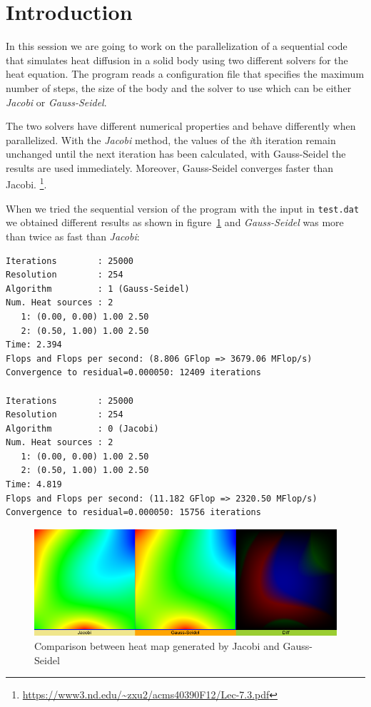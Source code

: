 \tableofcontents
\pagebreak

\section{Introduction}%
\label{sec:introduction}

In this session we are going to work on the parallelization of a sequential code that
simulates heat diffusion in a solid body using two different solvers for the heat equation.
The program reads a configuration file that specifies the maximum number of steps, the size
of the body and the solver to use which can be either \emph{Jacobi} or \emph{Gauss-Seidel}.

The two solvers have different numerical properties and behave differently when parallelized.
With the \emph{Jacobi} method, the values of the \emph{i}th iteration remain unchanged until
the next iteration has been calculated, with Gauss-Seidel the results are used immediately.
Moreover, Gauss-Seidel converges faster than Jacobi.
\footnote{\url{https://www3.nd.edu/~zxu2/acms40390F12/Lec-7.3.pdf}}.

When we tried the sequential version of the program with the input in \texttt{test.dat}
we obtained different results as shown in figure~\ref{fig:mosaic_label} and 
\emph{Gauss-Seidel} was more than twice as fast than \emph{Jacobi}:

\begin{verbatim}
Iterations        : 25000
Resolution        : 254
Algorithm         : 1 (Gauss-Seidel)
Num. Heat sources : 2
   1: (0.00, 0.00) 1.00 2.50 
   2: (0.50, 1.00) 1.00 2.50 
Time: 2.394 
Flops and Flops per second: (8.806 GFlop => 3679.06 MFlop/s)
Convergence to residual=0.000050: 12409 iterations

Iterations        : 25000
Resolution        : 254
Algorithm         : 0 (Jacobi)
Num. Heat sources : 2
   1: (0.00, 0.00) 1.00 2.50 
   2: (0.50, 1.00) 1.00 2.50 
Time: 4.819 
Flops and Flops per second: (11.182 GFlop => 2320.50 MFlop/s)
Convergence to residual=0.000050: 15756 iterations
\end{verbatim}


\begin{figure}[H]
    \centering
    \includegraphics[width=0.8\linewidth]{images/mosaic_label}
    \caption{Comparison between heat map generated by Jacobi and Gauss-Seidel}%
    \label{fig:mosaic_label}
\end{figure}

